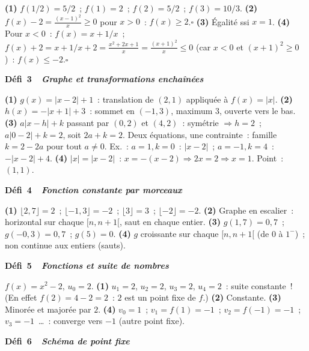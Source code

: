 \textbf{(1)} $f(1/2)=5/2$~; $f(1)=2$~; $f(2)=5/2$~; $f(3)=10/3$.
\textbf{(2)} $f(x)-2=\frac{(x-1)^2}{x}\geq0$ pour $x>0$~: $f(x)\geq2$.\hfill$\square$
\textbf{(3)} \'Egalit\'e ssi $x=1$.
\textbf{(4)} Pour $x<0$~: $f(x)=x+1/x$~; $f(x)+2=x+1/x+2=\frac{x^2+2x+1}{x}=\frac{(x+1)^2}{x}\leq0$
(car $x<0$ et $(x+1)^2\geq0$)~: $f(x)\leq-2$.\hfill$\square$

\noindent{}
{\color{BO}\bfseries\small D\'efi~3~\textendash\ \textit{Graphe et transformations enchaîn\'ees}}
\par\smallskip

\textbf{(1)} $g(x)=|x-2|+1$~: translation de $(2,1)$ appliqu\'ee \`a $f(x)=|x|$.
\textbf{(2)} $h(x)=-|x+1|+3$~: sommet en $(-1,3)$, maximum $3$, ouverte vers le bas.
\textbf{(3)} $a|x-h|+k$ passant par $(0,2)$ et $(4,2)$~: sym\'etrie $\Rightarrow h=2$~;
$a|0-2|+k=2$, soit $2a+k=2$. Deux \'equations, une contrainte~:
famille $k=2-2a$ pour tout $a\ne0$. Ex.~: $a=1,k=0$~: $|x-2|$~;
$a=-1,k=4$~: $-|x-2|+4$.
\textbf{(4)} $|x|=|x-2|$~: $x=-(x-2)\Rightarrow2x=2\Rightarrow x=1$. Point~: $(1,1)$.

\noindent{}
{\color{BO}\bfseries\small D\'efi~4~\textendash\ \textit{Fonction constante par morceaux}}
\par\smallskip

\textbf{(1)} $\lfloor2{,}7\rfloor=2$~; $\lfloor-1{,}3\rfloor=-2$~; $\lfloor3\rfloor=3$~; $\lfloor-2\rfloor=-2$.
\textbf{(2)} Graphe en escalier~: horizontal sur chaque $[n,n+1[$, saut en chaque entier.
\textbf{(3)} $g(1{,}7)=0{,}7$~; $g(-0{,}3)=0{,}7$~; $g(5)=0$.
\textbf{(4)} $g$ croissante sur chaque $[n,n+1[$ (de $0$ \`a $1^-$)~; non continue aux entiers (sauts).

\noindent{}
{\color{BO}\bfseries\small D\'efi~5~\textendash\ \textit{Fonctions et suite de nombres}}
\par\smallskip

$f(x)=x^2-2$, $u_0=2$.
\textbf{(1)} $u_1=2$, $u_2=2$, $u_3=2$, $u_4=2$~: suite constante~!
(En effet $f(2)=4-2=2$~: $2$ est un point fixe de $f$.)
\textbf{(2)} Constante.
\textbf{(3)} Minor\'ee et major\'ee par $2$.
\textbf{(4)} $v_0=1$~; $v_1=f(1)=-1$~; $v_2=f(-1)=-1$~; $v_3=-1$~\ldots~: converge vers $-1$ (autre point fixe).

\noindent{}
{\color{BO}\bfseries\small D\'efi~6~\textendash\ \textit{Sch\'ema de point fixe}}
\par\smallskip

